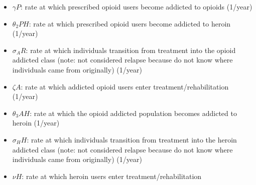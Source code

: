 \documentclass[12pt]{article}
\begin{document}
\begin{itemize}
\item $\gamma P$: rate at which prescribed opioid users become addicted to opioids (1/year)
\item $\theta_2 PH$: rate at which prescribed opioid users become addicted to heroin (1/year)
\item $\sigma_A R$: rate at which individuals transition from treatment into the opioid addicted class (note: not considered relapse because do not know where individuals came from originally) (1/year)
\item $\zeta A$: rate at which addicted opioid users enter treatment/rehabilitation (1/year)
\item $\theta_3 AH$: rate at which the opioid addicted population becomes addicted to heroin  (1/year)
\item$\sigma_H H$: rate at which individuals transition from treatment into the heroin addicted class (note: not considered relapse because do not know where individuals came from originally) (1/year)
\item $\nu H$: rate at which heroin users enter treatment/rehabilitation 
\end{itemize}
\end{document}
